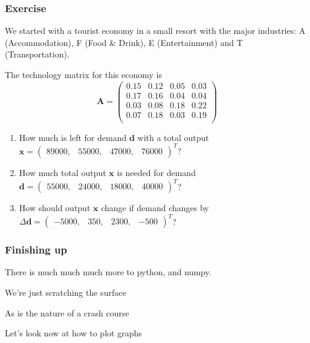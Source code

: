 \documentclass[dvips, %
               xcolor=pst,
               hyperref={colorlinks=false,
               dvips,
               citecolor=magenta,menucolor=cyan,
               bookmarks,bookmarksopen,pdfpagemode=UseThumbs}
              ]{beamer}
\renewcommand{\red}{}
\renewcommand{\blue}{}}{\newcommand{\emphy}{}}
\begin{document}
\begin{frame}[fragile]\frametitle{Exercise}
We started with a tourist economy in a small resort with the major industries:
A (Accommodation), F (Food \& Drink), E (Entertainment) and T (Transportation).

{\blue
The technology matrix for this economy is
\[
\boldsymbol{A} = \left(\begin{array}{rrrr}
 0.15 & 0.12 & 0.05 & 0.03  \\
 0.17 & 0.16 & 0.04 & 0.04  \\
 0.03 & 0.08 & 0.18 & 0.22  \\
 0.07 & 0.18 & 0.03 & 0.19  \\
\end{array}\right)
\]
}

\begin{enumerate}

\item
How much is left for demand $\boldsymbol{d}$ with a total output $\red\boldsymbol{x}=
\left(\begin{array}{rrrr}89000, & 55000, & 47000, & 76000\end{array}\right)^T$?

\item
How much total output $\boldsymbol{x}$ is needed for demand
$\red\boldsymbol{d} = \left(\begin{array}{rrrr}55000, & 24000, & 18000, & 40000\end{array}\right)^T$?

\item
How should output $\boldsymbol{x}$ change if demand changes by
$\red\Delta\boldsymbol{d} =\left(\begin{array}{rrrr}-5000, & 350, & 2300, & -500\end{array}\right)^T$?

\end{enumerate}

\end{frame}

\begin{frame}[fragile]\frametitle{Finishing up}
There is much much much more to python, and numpy. 

\pause\medskip
We're just scratching the surface 

\pause\medskip
As is the nature of a crash course

\pause\medskip
Let's look now at how to plot graphs

\end{frame}
\end{document}
